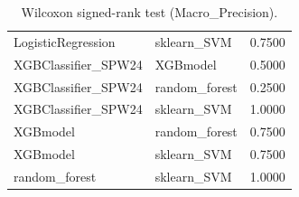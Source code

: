 \begin{table}[t]
\begin{tabular}{llr}
LogisticRegression & sklearn_SVM & 0.7500 \\
XGBClassifier_SPW24 & XGBmodel & 0.5000 \\
XGBClassifier_SPW24 & random_forest & 0.2500 \\
XGBClassifier_SPW24 & sklearn_SVM & 1.0000 \\
XGBmodel & random_forest & 0.7500 \\
XGBmodel & sklearn_SVM & 0.7500 \\
random_forest & sklearn_SVM & 1.0000 \\
\bottomrule
\end{tabular}
\caption{Wilcoxon signed-rank test (Macro_Precision).}
\label{tab:wilcoxon_Macro_Precision}
\end{table}